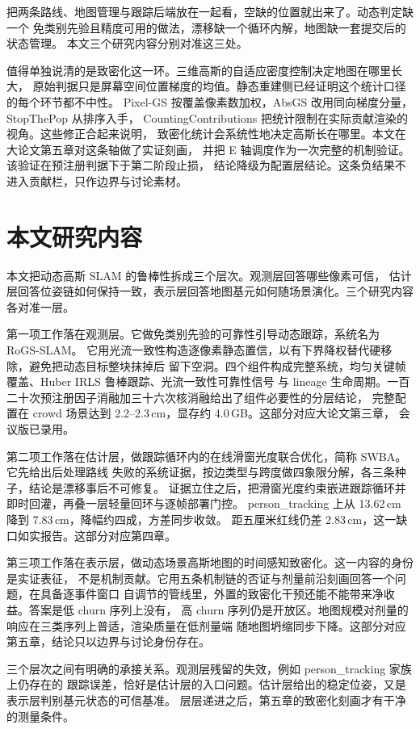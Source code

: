 把两条路线、地图管理与跟踪后端放在一起看，空缺的位置就出来了。动态判定缺一个
免类别先验且精度可用的做法，漂移缺一个循环内解，地图缺一套提交后的状态管理。
本文三个研究内容分别对准这三处。

值得单独说清的是致密化这一环。三维高斯的自适应密度控制决定地图在哪里长大，
原始判据只是屏幕空间位置梯度的均值。静态重建侧已经证明这个统计口径的每个环节都不中性。
Pixel-GS 按覆盖像素数加权，AbsGS 改用同向梯度分量，StopThePop 从排序入手，
CountingContributions 把统计限制在实际贡献渲染的视角。这些修正合起来说明，
致密化统计会系统性地决定高斯长在哪里。本文在大论文第五章对这条轴做了实证刻画，
并把 E 轴调度作为一次完整的机制验证。该验证在预注册判据下于第二阶段止损，
结论降级为配置层结论。这条负结果不进入贡献栏，只作边界与讨论素材。

\section{本文研究内容}

本文把动态高斯 SLAM 的鲁棒性拆成三个层次。观测层回答哪些像素可信，
估计层回答位姿链如何保持一致，表示层回答地图基元如何随场景演化。三个研究内容各对准一层。

第一项工作落在观测层。它做免类别先验的可靠性引导动态跟踪，系统名为 RoGS-SLAM。
它用光流一致性构造逐像素静态置信，以有下界降权替代硬移除，避免把动态目标整块抹掉后
留下空洞。四个组件构成完整系统，均匀关键帧覆盖、Huber IRLS 鲁棒跟踪、光流一致性可靠性信号
与 lineage 生命周期。一百二十次预注册因子消融加三十六次核消融给出了组件必要性的分层结论，
完整配置在 crowd 场景达到 2.2--2.3\,cm，显存约 4.0\,GB。这部分对应大论文第三章，
会议版已录用。

第二项工作落在估计层，做跟踪循环内的在线滑窗光度联合优化，简称 SWBA。它先给出后处理路线
失败的系统证据，按边类型与跨度做四象限分解，各三条种子，结论是漂移事后不可修复。
证据立住之后，把滑窗光度约束嵌进跟踪循环并即时回灌，再叠一层轻量回环与逐帧部署门控。
person\_tracking 上从 13.62\,cm 降到 7.83\,cm，降幅约四成，方差同步收敛。
距五厘米红线仍差 2.83\,cm，这一缺口如实报告。这部分对应第四章。

第三项工作落在表示层，做动态场景高斯地图的时间感知致密化。这一内容的身份是实证表征，
不是机制贡献。它用五条机制链的否证与剂量前沿刻画回答一个问题，在具备逐事件窗口
自调节的管线里，外置的致密化干预还能不能带来净收益。答案是低 churn 序列上没有，
高 churn 序列仍是开放区。地图规模对剂量的响应在三类序列上普适，渲染质量在低剂量端
随地图坍缩同步下降。这部分对应第五章，结论只以边界与讨论身份存在。

三个层次之间有明确的承接关系。观测层残留的失效，例如 person\_tracking 家族上仍存在的
跟踪误差，恰好是估计层的入口问题。估计层给出的稳定位姿，又是表示层判别基元状态的可信基准。
层层递进之后，第五章的致密化刻画才有干净的测量条件。

